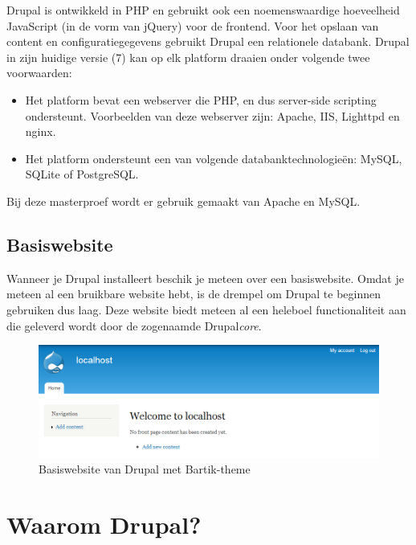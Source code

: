 Drupal is ontwikkeld in PHP en gebruikt ook een noemenswaardige hoeveelheid JavaScript (in de vorm van jQuery) voor de frontend. Voor het opslaan van content en configuratiegegevens gebruikt Drupal een relationele databank. Drupal in zijn huidige versie (7) kan op elk platform draaien onder volgende twee voorwaarden:
\begin{itemize}
\item Het platform bevat een webserver die PHP, en dus server-side scripting ondersteunt. Voorbeelden van deze webserver zijn:  Apache, IIS, Lighttpd en nginx.
\item Het platform ondersteunt een van volgende databanktechnologie\"{e}n: MySQL, SQLite of PostgreSQL.
\end{itemize}
Bij deze masterproef wordt er gebruik gemaakt van Apache en MySQL.

\subsection{Basiswebsite}

Wanneer je Drupal installeert beschik je meteen over een basiswebsite. Omdat je meteen al een bruikbare website hebt, is de drempel om Drupal te beginnen gebruiken dus laag. Deze website biedt meteen al een heleboel functionaliteit aan die geleverd wordt door de zogenaamde Drupal\textit{core}. %
\begin{figure}[h]
\begin{center}
\includegraphics[keepaspectratio,width=1\textwidth]{fig/drupalBasiswebsite}
\vspace{-10pt}
\caption{Basiswebsite van Drupal met Bartik-theme}
\vspace{-30pt}
\end{center}
\end{figure}

\section{Waarom Drupal?}


